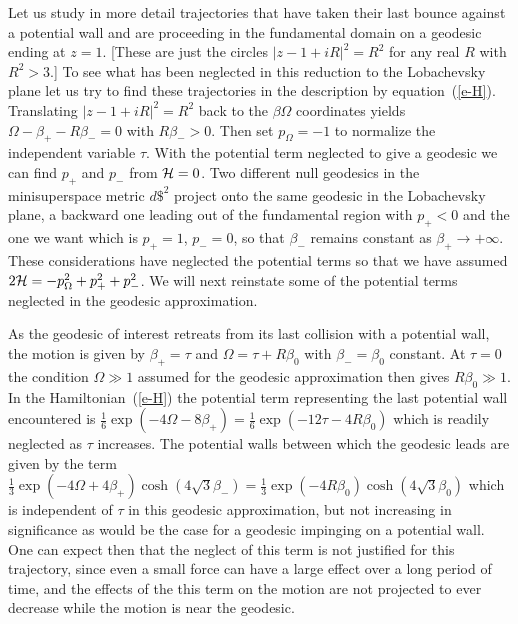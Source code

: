 Let us study in more detail trajectories that have taken their last
bounce against a potential wall and are proceeding in the fundamental
domain on a geodesic ending at $z=1$. [These are just the circles
$|z-1 + iR|^2 = R^2$ for any real $R$ with $R^2 > 3$.]  To see what
has been neglected in this reduction to the Lobachevsky plane let us
try to find these trajectories in the description by
equation~(\ref{e-H}).  Translating $|z-1 + iR|^2 = R^2$ back to the
$\beta\Omega$ coordinates yields $\Omega-\beta_+ -R\beta_- = 0$ with
$R\beta_- > 0$.
Then set $p_\Omega = -1$ to normalize the independent
variable $\tau$. With the potential term neglected to give a geodesic
we can find $p_+$ and $p_-$ from ${\cal H} = 0$.  Two different null
geodesics in the minisuperspace metric $d\$^2$ project onto the same
geodesic in the Lobachevsky plane, a backward one leading out of the
fundamental region with $p_+ < 0$ and the one we want which is $p_+ =
1$, $p_- = 0$, so that $\beta_-$ remains constant as $\beta_+
\rightarrow +\infty$.  These considerations have neglected the
potential terms so that we have assumed $2{\cal H} = -p_\Omega^2 +
p_+^2 + p_-^2 $.  We will next reinstate some of the potential terms
neglected in the geodesic approximation.

As the geodesic of interest retreats from its last collision with a
potential wall, the motion is given by $\beta_+ = \tau$ and $\Omega =
\tau + R \beta_0$ with $\beta_- = \beta_0$ constant.
At $\tau = 0$ the condition $\Omega \gg 1$ assumed for the geodesic
approximation then gives $R\beta_0  \gg 1$.  In the
Hamiltonian~(\ref{e-H}) the potential term representing the last
potential wall encountered is $\frac{1}{6}\exp(-4\Omega - 8\beta_+) =
\frac{1}{6}\exp(-12\tau-4R\beta_0)$ which is readily neglected as
$\tau$ increases.  The potential walls between which the geodesic
leads are given by the term $\frac{1}{3}\exp(-4\Omega + 4\beta_+)
\cosh(4\sqrt{3}\beta_-) = \frac{1}{3} \exp(-4R\beta_0)
\cosh(4\sqrt{3}\beta_0)$ which is independent of $\tau$ in this
geodesic approximation, but not increasing in significance as would
be the case for a geodesic impinging on a potential wall.  One can
expect then that the neglect of this term is not justified for this
trajectory, since even a small force can have a large effect over a
long period of time, and the effects of the this term on the motion
are not projected to ever decrease while the motion is near the
geodesic.

